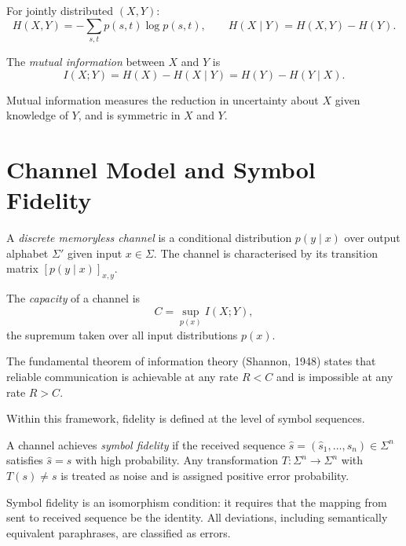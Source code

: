 \documentclass[11pt,openany]{book}
\begin{document}
\begin{definition}
For jointly distributed $(X, Y)$:
\[
  H(X,Y) = -\sum_{s,t} p(s,t) \log p(s,t),
  \qquad
  H(X \mid Y) = H(X,Y) - H(Y).
\]
\end{definition}

\begin{definition}
The \emph{mutual information} between $X$ and $Y$ is
\[
  I(X;Y) = H(X) - H(X \mid Y) = H(Y) - H(Y \mid X).
\]
\end{definition}

Mutual information measures the reduction in uncertainty
about $X$ given knowledge of $Y$, and is symmetric in $X$
and $Y$.

\section{Channel Model and Symbol Fidelity}
\label{sec:channel-model}

\begin{definition}
A \emph{discrete memoryless channel} is a conditional
distribution $p(y \mid x)$ over output alphabet $\Sigma'$
given input $x \in \Sigma$.  The channel is characterised
by its transition matrix $[p(y \mid x)]_{x,y}$.
\end{definition}

\begin{definition}
The \emph{capacity} of a channel is
\[
  C = \sup_{p(x)} I(X;Y),
\]
the supremum taken over all input distributions $p(x)$.
\end{definition}

The fundamental theorem of information theory (Shannon,
1948) states that reliable communication is achievable at
any rate $R < C$ and is impossible at any rate $R > C$.

Within this framework, fidelity is defined at the level of
symbol sequences.

\begin{definition}
\label{def:symbol-fidelity}
A channel achieves \emph{symbol fidelity} if the received
sequence $\hat{s} = (\hat{s}_1, \ldots, \hat{s}_n) \in
\Sigma^n$ satisfies $\hat{s} = s$ with high probability.
Any transformation $T : \Sigma^n \to \Sigma^n$ with
$T(s) \neq s$ is treated as noise and is assigned positive
error probability.
\end{definition}

\begin{remark}
Symbol fidelity is an isomorphism condition: it requires
that the mapping from sent to received sequence be the
identity.  All deviations, including semantically equivalent
paraphrases, are classified as errors.
\end{remark}
\end{document}
